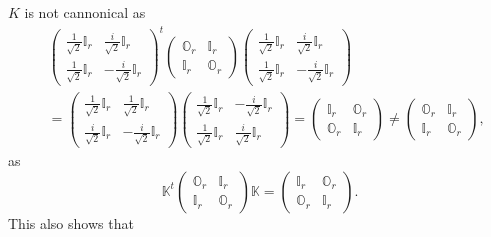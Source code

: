 \documentclass[aps, preprint]{revtex4}
\begin{document}
$K$ is not cannonical as
\begin{align} & \left (\begin{array}{cc}\frac{1}{\sqrt{2}} \mathbb{I}_{r} & \frac{i}{\sqrt{2}} \mathbb{I}_{r} \\
\frac{1}{\sqrt{2}} \mathbb{I}_{r} &  -\frac{i}{\sqrt{2}} \mathbb{I}_{r}\end{array}\right )^{t} \left (\begin{array}{cc}\mathbb{O}_{r} & \mathbb{I}_{r} \\
\mathbb{I}_{r} & \mathbb{O}_{r}\end{array}\right ) \left (\begin{array}{cc}\frac{1}{\sqrt{2}} \mathbb{I}_{r} & \frac{i}{\sqrt{2}} \mathbb{I}_{r} \\
\frac{1}{\sqrt{2}} \mathbb{I}_{r} &  -\frac{i}{\sqrt{2}} \mathbb{I}_{r}\end{array}\right ) \nonumber  \\
 &  =\left (\begin{array}{cc}\frac{1}{\sqrt{2}} \mathbb{I}_{r} & \frac{1}{\sqrt{2}} \mathbb{I}_{r} \\
\frac{i}{\sqrt{2}} \mathbb{I}_{r} &  -\frac{i}{\sqrt{2}} \mathbb{I}_{r}\end{array}\right ) \left (\begin{array}{cc}\frac{1}{\sqrt{2}} \mathbb{I}_{r} &  -\frac{i}{\sqrt{2}} \mathbb{I}_{r} \\
\frac{1}{\sqrt{2}} \mathbb{I}_{r} & \frac{i}{\sqrt{2}} \mathbb{I}_{r}\end{array}\right ) =\left (\begin{array}{cc}\mathbb{I}_{r} & \mathbb{O}_{r} \\
\mathbb{O}_{r} & \mathbb{I}_{r}\end{array}\right ) \neq \left (\begin{array}{cc}\mathbb{O}_{r} & \mathbb{I}_{r} \\
\mathbb{I}_{r} & \mathbb{O}_{r}\end{array}\right )\text{,}\end{align}as
\begin{equation}\mathbb{K}^{t} \left (\begin{array}{cc}\mathbb{O}_{r} & \mathbb{I}_{r} \\
\mathbb{I}_{r} & \mathbb{O}_{r}\end{array}\right ) \mathbb{K} =\left (\begin{array}{cc}\mathbb{I}_{r} & \mathbb{O}_{r} \\
\mathbb{O}_{r} & \mathbb{I}_{r}\end{array}\right )\text{.}
\end{equation}This also shows that
\end{document}
